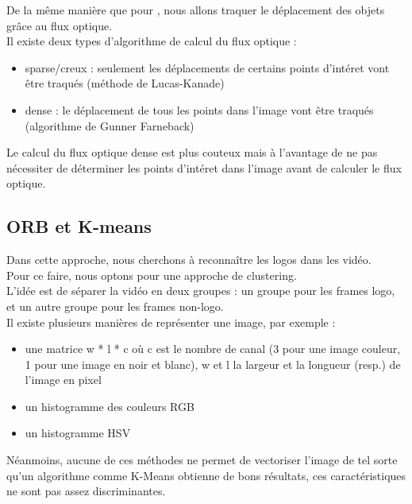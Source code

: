 \documentclass[11pt]{article}
\begin{document}
De la même manière que pour \cite{wang11_action}, nous allons traquer le déplacement des objets grâce au flux optique.\\
Il existe deux types d'algorithme de calcul du flux optique :\\
\begin{itemize}
\item sparse/creux : seulement les déplacements de certains points d'intéret vont être traqués (méthode de Lucas-Kanade)\\
\item dense : le déplacement de tous les points dans l'image vont être traqués (algorithme de Gunner Farneback)\\
\end{itemize}
Le calcul du flux optique dense est plus couteux mais à l'avantage de ne pas nécessiter de déterminer les points d'intéret dans l'image avant de calculer le flux optique.\\

\subsection{ORB et K-means}
\label{sec:org913b926}
Dans cette approche, nous cherchons à reconnaître les logos dans les vidéo.\\
Pour ce faire, nous optons pour une approche de clustering.\\
L'idée est de séparer la vidéo en deux groupes : un groupe pour les frames logo, et un autre groupe pour les frames non-logo.\\

Il existe plusieurs manières de représenter une image, par exemple :\\
\begin{itemize}
\item une matrice w * l * c où c est le nombre de canal (3 pour une image couleur, 1 pour une image en noir et blanc), w et l la largeur et la longueur (resp.) de l'image en pixel\\
\item un histogramme des couleurs RGB\\
\item un histogramme HSV\\
\end{itemize}
Néanmoins, aucune de ces méthodes ne permet de vectoriser l'image de tel sorte qu'un algorithme comme K-Means obtienne de bons résultats, ces caractéristiques ne sont pas assez discriminantes.\\
\end{document}
